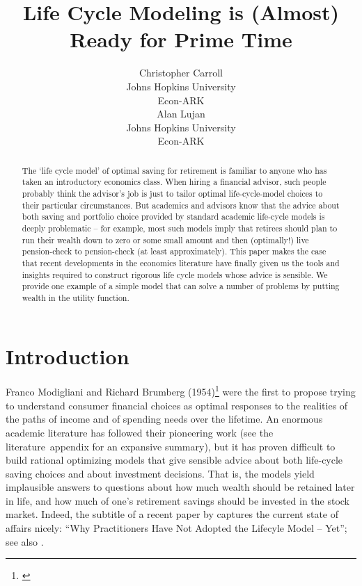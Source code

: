 \documentclass{article}
\title{Life Cycle Modeling is (Almost) Ready for Prime Time}
\date{\displaydate{articleDate}}
\author{Christopher Carroll\footnotemark[1]\\
Johns Hopkins University\\Econ-ARK\\\AND
Alan Lujan\\
Johns Hopkins University\\Econ-ARK\\}
\begin{document}
\maketitle
{}

\begin{abstract}
The `life cycle model' of optimal saving for retirement is familiar to anyone who has taken an introductory economics class.
When hiring a financial advisor, such people probably think the advisor's job is just to tailor optimal life-cycle-model choices to their particular circumstances.
But academics and advisors know that the advice about both saving and portfolio choice provided by standard academic life-cycle models is deeply problematic -- for example, most such models imply that retirees should plan to run their wealth down to zero or some small amount and then (optimally!) live pension-check to pension-check (at least approximately).
This paper makes the case that recent developments in the economics literature have finally given us the tools and insights required to construct rigorous life cycle models whose advice is sensible.
We provide one example of a simple model that can solve a number of problems by putting wealth in the utility function.
\end{abstract}

\keywords{}


\section{Introduction}

Franco Modigliani and Richard Brumberg (1954)\footnote{\cite{2005}} were the first to propose trying to understand consumer financial choices as optimal responses to the realities of the paths of income and of spending needs over the lifetime.
An enormous academic literature has followed their pioneering work (see the literature~appendix for an expansive summary),
but it has proven difficult to build rational optimizing models that give sensible advice about both life-cycle saving choices and about investment decisions.
That is, the models yield implausible answers to questions about how much wealth should be retained later in life, and how much of one's retirement savings should be invested in the stock market.
Indeed, the subtitle of a recent paper by \cite{Daga_2023} captures the current state of affairs nicely: ``Why Practitioners Have Not Adopted the Lifecyle Model -- Yet''; see also \cite{DeNardi2016d}.
\end{document}
